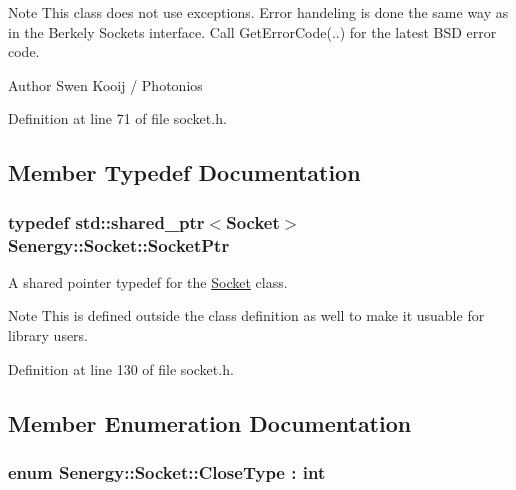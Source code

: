 \begin{DoxyNote}{Note}
This class does not use exceptions. Error handeling is done the same way as in the Berkely Sockets interface. Call Get\-Error\-Code(..) for the latest B\-S\-D error code.
\end{DoxyNote}
\begin{DoxyAuthor}{Author}
Swen Kooij / Photonios 
\end{DoxyAuthor}


Definition at line 71 of file socket.\-h.



\subsection{Member Typedef Documentation}
\hypertarget{class_senergy_1_1_socket_ac9ff20ce80df2d0c2900cd0940ffe860}{
\subsubsection[{Socket\-Ptr}]{\setlength{\rightskip}{0pt plus 5cm}typedef std\-::shared\-\_\-ptr$<${\bf Socket}$>$ {\bf Senergy\-::\-Socket\-::\-Socket\-Ptr}}}\label{class_senergy_1_1_socket_ac9ff20ce80df2d0c2900cd0940ffe860}


A shared pointer typedef for the \hyperlink{class_senergy_1_1_socket}{Socket} class. 

\begin{DoxyNote}{Note}
This is defined outside the class definition as well to make it usuable for library users. 
\end{DoxyNote}


Definition at line 130 of file socket.\-h.



\subsection{Member Enumeration Documentation}
\hypertarget{class_senergy_1_1_socket_a88ed1eb1a5c47ea1b395715aabd37ab4}{
\subsubsection[{Close\-Type}]{\setlength{\rightskip}{0pt plus 5cm}enum {\bf Senergy\-::\-Socket\-::\-Close\-Type} \-: int\hspace{0.3cm}{\ttfamily [strong]}}}\label{class_senergy_1_1_socket_a88ed1eb1a5c47ea1b395715aabd37ab4}


